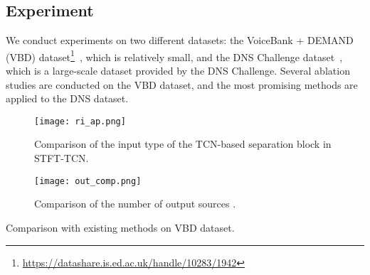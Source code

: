 \documentclass[a4paper]{article}
\begin{document}
\begin{spacing}{0.915}
\vspace{-2mm}
\section{Experiment}
We conduct experiments on two different datasets:
the VoiceBank + DEMAND (VBD) dataset\footnote{
\url{https://datashare.is.ed.ac.uk/handle/10283/1942}
}~\cite{veaux2013voice,thiemann2013diverse,valentini2016investigating}, which is relatively small, and the DNS Challenge dataset~\cite{reddy2020interspeech}, which is a large-scale dataset provided by the DNS Challenge.
Several ablation studies are conducted on the VBD dataset, 
and the most promising methods are applied to the DNS dataset.

\begin{figure}[t]
  \centering
  \texttt{[image: ri\_ap.png]}
  \caption{Comparison of the input type of the TCN-based separation block in STFT-TCN.}
\label{fig:ri_ap}
\end{figure}


\begin{figure}[tb]
  \centering
  \texttt{[image: out\_comp.png]}
  \caption{Comparison of the number of output sources .} \label{fig:out_comp}
\end{figure}

    

\begin{table}[tb]
\begin{center}
    \caption{Comparison with existing methods on VBD dataset.}
  \label{tab:all_comp}
\scalebox{0.68}{

}
\end{center}
\end{table}
\end{spacing}
\end{document}
